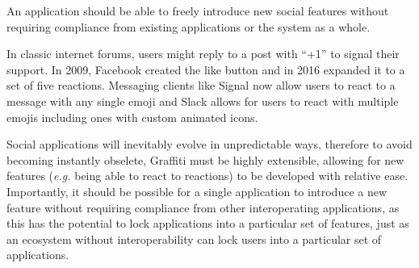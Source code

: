 




\begin{requirement}
\label{requirements:autonomous-extensibility}
    An application should be able to freely introduce new social features without requiring compliance from existing applications or the system as a whole.
\end{requirement}

In classic internet forums, users might reply to a post with ``+1'' to signal their support.
In 2009, Facebook created the like button and in 2016 expanded it to a set of five reactions.
Messaging clients like Signal now allow users to react to a message with any single emoji and
Slack allows for users to react with multiple emojis including ones with custom animated icons.

Social applications will inevitably evolve in unpredictable ways,
therefore to avoid becoming instantly obselete, Graffiti must be highly extensible,
allowing for new features (\emph{e.g.} being able to react to reactions)
to be developed with relative ease.
Importantly, it should be possible for a single application to introduce a new feature
without requiring compliance from other interoperating applications, as this has the potential to
lock applications into a particular set of features,
just as an ecosystem without interoperability can lock users into a
particular set of applications.

